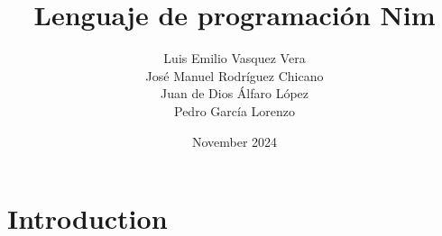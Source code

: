\documentclass{article}
\title{Lenguaje de programación Nim}
\author{Luis Emilio Vasquez Vera
\\José Manuel Rodríguez Chicano
\\Juan de Dios Álfaro López
\\Pedro García Lorenzo}
\date{November 2024}
\begin{document}
\maketitle

\section{Introduction}
\end{document}
